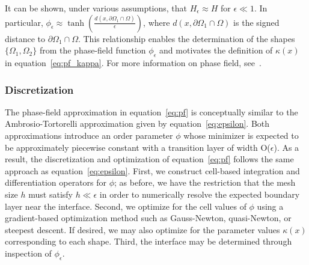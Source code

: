 \documentclass[manuscript,revised]{geophysics}
\begin{document}
It can be shown, under various assumptions, that $H_\epsilon \approx H$ for $\epsilon \ll 1$.  In particular, $\phi_\epsilon \approx \tanh{\left(  \frac{d \left( x, \partial\Omega_1 \cap \Omega \right)}{\epsilon}   \right) }$, where $d(x,\partial\Omega_1 \cap \Omega )$ is the signed distance to $\partial\Omega_1 \cap \Omega$. This relationship enables the determination of the shapes $\{\Omega_1, \Omega_2 \}$ from the phase-field function $\phi_\epsilon$ and motivates the definition of $\kappa(x)$ in equation~\ref{eq:pf_kappa}.  For more information on phase field, see~\cite{Deckelnick_2005}.


\subsubsection{Discretization}

The phase-field approximation in equation~\ref{eq:pf} is conceptually similar to the Ambrosio-Tortorelli approximation given by equation~\ref{eq:epsilon}.  Both approximations introduce an order parameter $\phi$ whose minimizer is expected to be approximately piecewise constant with a transition layer of width  O($\epsilon$).  As a result, the discretization and optimization of equation~\ref{eq:pf} follows the same approach as equation~\ref{eq:epsilon}.  First, we construct cell-based integration and differentiation operators for $\phi$; as before, we have the restriction that the mesh size $h$  must satisfy $h \ll \epsilon$ in order to numerically resolve the expected boundary layer near the interface. Second, we optimize for the cell values of $\phi$ using a gradient-based optimization method such as Gauss-Newton, quasi-Newton, or steepest descent.  If desired, we may also optimize for the parameter values $\kappa(x)$ corresponding to each shape.  Third, the interface may be determined through inspection of $\phi_\epsilon$.
\end{document}
